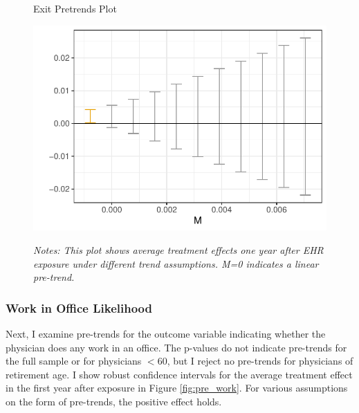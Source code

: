 \documentclass[12pt]{article}
\begin{document}
\begin{figure}[ht]
    \centering
    \captionsetup{width=.5\linewidth}
    \caption{Exit Pretrends Plot}
    \includegraphics[scale=.5]{Objects/retire_pretrends_plot.pdf}
    \label{fig:pre_retire}
    \vspace{2mm}
    \caption*{\footnotesize{\textit{Notes: This plot shows average treatment effects one year after EHR exposure under different trend assumptions. M=0 indicates a linear pre-trend.}}}
\end{figure}

\subsubsection{Work in Office Likelihood}

Next, I examine pre-trends for the outcome variable indicating whether the physician does any work in an office. The p-values do not indicate pre-trends for the full sample or for physicians $< 60$, but I reject no pre-trends for physicians of retirement age. I show robust confidence intervals for the average treatment effect in the first year after exposure in Figure \ref{fig:pre_work}. For various assumptions on the form of pre-trends, the positive effect holds.
\end{document}

